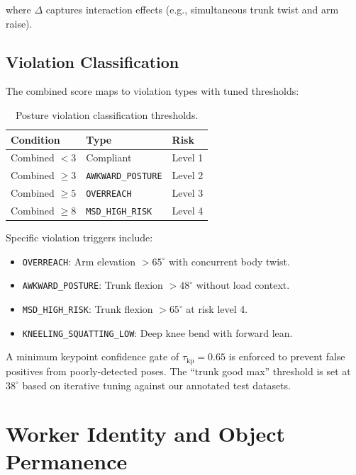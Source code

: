 \documentclass[11pt, twocolumn]{article}
\begin{document}
where $\Delta$ captures interaction effects (e.g., simultaneous trunk twist and arm raise).

\subsection{Violation Classification}

The combined score maps to violation types with tuned thresholds:

\begin{table}[H]
\centering
\small
\caption{Posture violation classification thresholds.}
\begin{tabular}{lll}
\toprule
\textbf{Condition} & \textbf{Type} & \textbf{Risk} \\
\midrule
Combined $< 3$ & Compliant & Level 1 \\
Combined $\geq 3$ & \texttt{AWKWARD\_POSTURE} & Level 2 \\
Combined $\geq 5$ & \texttt{OVERREACH} & Level 3 \\
Combined $\geq 8$ & \texttt{MSD\_HIGH\_RISK} & Level 4 \\
\bottomrule
\end{tabular}
\end{table}

Specific violation triggers include:
\begin{itemize}[nosep, leftmargin=*]
    \item \texttt{OVERREACH}: Arm elevation $> 65^\circ$ with concurrent body twist.
    \item \texttt{AWKWARD\_POSTURE}: Trunk flexion $> 48^\circ$ without load context.
    \item \texttt{MSD\_HIGH\_RISK}: Trunk flexion $> 65^\circ$ at risk level 4.
    \item \texttt{KNEELING\_SQUATTING\_LOW}: Deep knee bend with forward lean.
\end{itemize}

A minimum keypoint confidence gate of $\tau_{\text{kp}} = 0.65$ is enforced to prevent false positives from poorly-detected poses. The ``trunk good max'' threshold is set at $38^\circ$ based on iterative tuning against our annotated test datasets.

\section{Worker Identity and Object Permanence}
\end{document}
